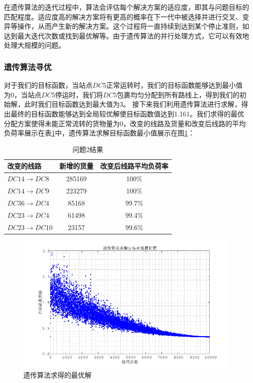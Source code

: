 \documentclass{MathorCupmodeling}
\begin{document}
在遗传算法的迭代过程中，算法会评估每个解决方案的适应度，即其与问题目标的匹配程度。适应度高的解决方案将有更高的概率在下一代中被选择并进行交叉、变异等操作，从而产生新的解决方案。这个过程将一直持续到达到某个停止准则，如达到最大迭代次数或找到最优解等。由于遗传算法的并行处理方式，它可以有效地处理大规模的问题。
\subsubsection{遗传算法寻优}
对于我们的目标函数，当站点$DC5$正常运转时，我们的目标函数能够达到最小值为0，当站点$DC5$停运时，我们将$DC5$包裹均匀分配到所有路线上，得到我们的初始解，此时我们目标函数达到最大值为3。
接下来我们利用遗传算法进行求解，得出最终的目标函数能够达到全局较优解使目标函数值达到1.161。我们求得的最优分配方案使得未能正常流转的货物量为0，改变的线路及货量和改变后线路的平均负荷率展示在表\ref{wt2}中，遗传算法求解目标函数最小值展示在图\ref{yichuan}：
\begin{table}[h]
\centering
\caption{问题2结果}
\label{wt2}
\begin{tabular}{lcc}
\hline
改变的线路&	新增的货量&	改变后线路平均负荷率 \\ \hline
$DC14\to DC8 $   & 285169  & 100$\%$  \\
$DC14\to DC9$  & 223279   & 100$\%$ \\
$DC36\to DC4$   & 85168  & 99.7$\%$  \\
$DC23 \to DC4$  & 61498   & 99.4$\%$ \\
$DC23\to DC10$  & 23157    &99.6$\%$\\\hline
\end{tabular}
\end{table}
\begin{figure}[H]
		\centering
		\includegraphics[width=\textwidth]{figure/3.pdf}
		\caption{遗传算法求得的最优解}\label{yichuan}
	\end{figure}
\end{document}

